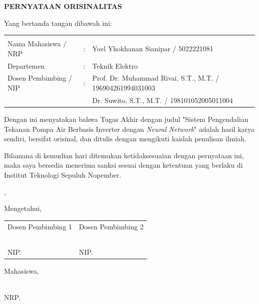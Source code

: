 \begin{center}
  \large
  \textbf{PERNYATAAN ORISINALITAS}
\end{center}

\thispagestyle{empty}

\vspace{2ex}


\noindent Yang bertanda tangan dibawah ini:

\noindent\begin{tabularx}{\textwidth}{l l X}
                         &   &                            \\
  Nama Mahasiswa / NRP   & : & Yoel Yhokhanan Sianipar / 5022221081          \\
  Departemen             & : & Teknik Elektro             \\
  Dosen Pembimbing / NIP & : & Prof. Dr. Muhammad Rivai, S.T., M.T. / 196904261994031003 \\
                         &   & Dr. Suwito, S.T., M.T. / 198101052005011004                          \\
\end{tabularx}

Dengan ini menyatakan bahwa Tugas Akhir dengan judul "Sistem Pengendalian Tekanan Pompa Air Berbasis
Inverter dengan \emph{Neural Network}" adalah hasil karya sendiri, bersifat orisinal, dan ditulis dengan mengikuti kaidah penulisan ilmiah.

Bilamana di kemudian hari ditemukan ketidaksesuaian dengan pernyataan ini, maka saya bersedia menerima sanksi sesuai dengan ketentuan yang berlaku di Institut Teknologi Sepuluh Nopember.

\vspace{6ex}

\noindent\hfill \place{}, \ENGMONTH{} \the\year{}

\vspace{2ex}

\noindent Mengetahui,

\vspace{1ex}

\noindent\begin{tabularx}{\textwidth}{>{\centering\arraybackslash}X >{\centering\arraybackslash}X}
  Dosen Pembimbing 1       & Dosen Pembimbing 2          \\
                           &                             \\
                           &                             \\
                           &                             \\
                           &                             \\
  \advisor{}               & \coadvisor{}                \\
  NIP. \advisornip{}       & NIP. \coadvisornip{}        \\
\end{tabularx}

\vspace{7ex}

\begin{center}
  Mahasiswa,

  \vspace{14ex}

  \name{} \\
  NRP. \nrp{}
\end{center}
